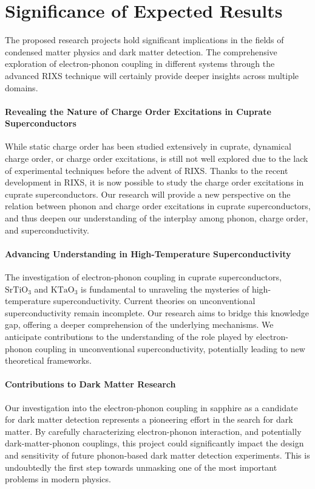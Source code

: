 \documentclass[11pt]{article}
\begin{document}
\section{Significance of Expected Results}

The proposed research projects hold significant implications in the fields of condensed matter physics and dark matter detection. The comprehensive exploration of electron-phonon coupling in different systems through the advanced RIXS technique will certainly provide deeper insights across multiple domains.

\paragraph{Revealing the Nature of Charge Order Excitations in Cuprate Superconductors} While static charge order has been studied extensively in cuprate, dynamical charge order, or charge order excitations, is still not well explored due to the lack of experimental techniques before the advent of RIXS\cite{li_multiorbital_2020}. Thanks to the recent development in RIXS, it is now possible to study the charge order excitations in cuprate superconductors. Our research will provide a new perspective on the relation between phonon and charge order excitations in cuprate superconductors, and thus deepen our understanding of the interplay among phonon, charge order, and superconductivity. 

\paragraph{Advancing Understanding in High-Temperature Superconductivity}
The investigation of electron-phonon coupling in cuprate superconductors, $\mathrm{SrTiO_{3}}$ and $\mathrm{KTaO_{3}}$ is fundamental to unraveling the mysteries of high-temperature superconductivity. Current theories on unconventional superconductivity remain incomplete. Our research aims to bridge this knowledge gap, offering a deeper comprehension of the underlying mechanisms. We anticipate contributions to the understanding of the role played by electron-phonon coupling in unconventional superconductivity, potentially leading to new theoretical frameworks. 

\paragraph{Contributions to Dark Matter Research}
Our investigation into the electron-phonon coupling in sapphire as a candidate for dark matter detection represents a pioneering effort in the search for dark matter. By carefully characterizing electron-phonon interaction, and potentially dark-matter-phonon couplings, this project could significantly impact the design and sensitivity of future phonon-based dark matter detection experiments. This is undoubtedly the first step towards unmasking one of the most important problems in modern physics.
\end{document}
